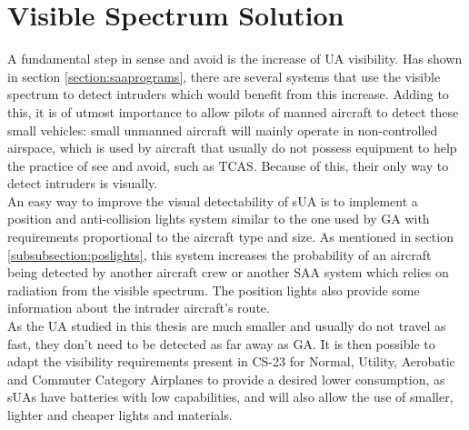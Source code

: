 
\chapter{Visible Spectrum Solution}
\label{chapter:passive}

A fundamental step in sense and avoid is the increase of UA visibility. Has shown in section \ref{section:saaprograms}, there are several systems that use the visible spectrum to detect intruders which would benefit from this increase. Adding to this, it is of utmost importance to allow pilots of manned aircraft to detect these small vehicles: small unmanned aircraft will mainly operate in non-controlled airspace, which is used by aircraft that usually do not possess equipment to help the practice of see and avoid, such as TCAS. Because of this, their only way to detect intruders is visually.\\
An easy way to improve the visual detectability of sUA is to implement a position and anti-collision lights system similar to the one used by GA with requirements proportional to the aircraft type and size. As mentioned in section \ref{subsubsection:poslights}, this system increases the probability of an aircraft being detected by another aircraft crew or another SAA system which relies on radiation from the visible spectrum. The position lights also provide some information about the intruder aircraft's route.\\
As the UA studied in this thesis are much smaller and usually do not travel as fast, they don't need to be detected as far away as GA. It is then possible to adapt the visibility requirements present in CS-23 for Normal, Utility, Aerobatic and Commuter Category Airplanes to provide a desired lower consumption, as sUAs have batteries with low capabilities, and will also allow the use of smaller, lighter and cheaper lights and materials.

